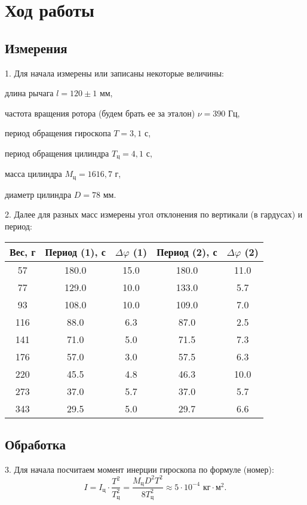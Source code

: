 \section{Ход работы}
\subsection{Измерения}
1. Для начала измерены или записаны некоторые величины:
\begin{center}
    длина рычага $l = 120 \pm 1$ мм,

    частота вращения ротора (будем брать ее за эталон) $\nu = 390$ Гц,

    период обращения гироскопа $T = 3,1$ с,

    период обращения цилиндра $T_{\text{ц}} = 4,1$ с,

    масса цилиндра $M_\text{ц} = 1616,7$ г,

    диаметр цилиндра $D = 78$ мм.
\end{center}

2. Далее для разных масс измерены угол отклонения по вертикали (в гардусах) и
период:
\begin{center}
\begin{tabular}{|c|c|c|c|c|}
    \hline
    Вес, г& Период (1), с& $\Delta\varphi$ (1)& Период (2), с& $\Delta\varphi$ (2)\\
    \hline
    57 & 180.0 & 15.0 & 180.0 & 11.0\\
    \hline
    77 & 129.0 & 10.0 & 133.0 & 5.7\\
    \hline
    93 & 108.0 & 10.0 & 109.0 & 7.0\\
    \hline
    116 & 88.0 & 6.3 & 87.0 & 2.5\\
    \hline
    141 & 71.0 & 5.0 & 71.5 & 7.3\\
    \hline
    176 & 57.0 & 3.0 & 57.5 & 6.3\\
    \hline
    220 & 45.5 & 4.8 & 46.3 & 10.0\\
    \hline
    273 & 37.0 & 5.7 & 37.0 & 5.7\\
    \hline
    343 & 29.5 & 5.0 & 29.7 & 6.6\\
    \hline
\end{tabular}
\end{center}
\subsection{Обработка}

3. Для начала посчитаем момент инерции гироскопа по формуле (номер):
\begin{equation*}
    I = I_\text{ц}\cdot\frac{T^2}{T_\text{ц}^2} = \frac{M_\text{ц}D^2T^2}{8T_\text{ц}^2} \approx 5 \cdot 10^{-4} \text{ кг}\cdot\text{м}^2.
\end{equation*}

